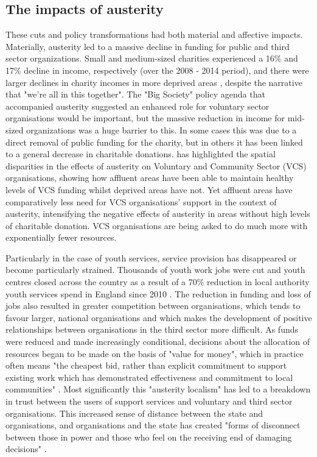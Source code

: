 \subsection{The impacts of austerity }
\label{the-impacts-of-austerity}

These cuts and policy transformations had both material and affective impacts. Materially, austerity led to a massive decline in funding for public and third sector organizations. Small and medium-sized charities experienced a 16\% and 17\% decline in income, respectively (over the 2008 - 2014 period), and there were larger declines in charity incomes in more deprived areas \citep{clifford_charitable_2017}, despite the narrative that "we're all in this together". The "Big Society" policy agenda that accompanied austerity suggested an enhanced role for voluntary sector organisations would be important, but the massive reduction in income for mid-sized organizations was a huge barrier to this. In some cases this was due to a direct removal of public funding for the charity, but in others it has been linked to a general decrease in charitable donations. \citet{jones_uneven_2016} has highlighted the spatial disparities in the effects of austerity on Voluntary and Community Sector (VCS) organisations, showing how affluent areas have been able to maintain healthy levels of VCS funding whilst deprived areas have not. Yet affluent areas have comparatively less need for VCS organisations' support in the context of austerity, intensifying the negative effects of austerity in areas without high levels of charitable donation. VCS organisations are being asked to do much more with exponentially fewer resources.

Particularly in the case of youth services, service provision has disappeared or become particularly strained. Thousands of youth work jobs were cut and youth centres closed across the country as a result of a 70\% reduction in local authority youth services spend in England since 2010 \citep[9]{ymca_making_2020}. The reduction in funding and loss of jobs also resulted in greater competition between organisations, which tends to favour larger, national organisations and which makes the development of positive relationships between organisations in the third sector more difficult. As funds were reduced and made increasingly conditional, decisions about the allocation of resources began to be made on the basis of "value for money", which in practice often means "the cheapest bid, rather than explicit commitment to support existing work which has demonstrated effectiveness and commitment to local communities" \citep[732]{clayton_distancing_2016}. Most significantly this "austerity localism" has led to a breakdown in trust between the users of support services and voluntary and third sector organisations. This increased sense of distance between the state and organisations, and organisations and the state has created "forms of disconnect between those in power and those who feel on the receiving end of damaging decisions" \citep[737]{clayton_distancing_2016}.

